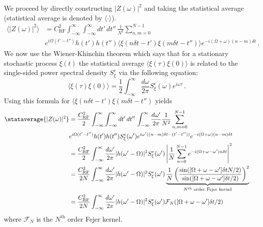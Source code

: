 We proceed by directly constructing $|Z(\omega)|^2$ and taking the statistical average (statistical average is denoted by $\langle \cdot \rangle$).
\begin{align}
  \langle \left| Z(\omega) \right| ^2 \rangle
  &= C_\text{RF}^2 \int_{-\infty}^\infty \int_{-\infty}^\infty dt' \, dt'' \,
  \frac{1}{N^2} \sum_{n,m=0}^{N-1} \nonumber \\
  & e^{i\Omega (t' - t'')} h(t') h(t'')
  \langle \xi(n\delta t - t') \xi(m\delta t - t'') \rangle
  e^{-i(\Omega + \omega)(n - m)\delta t} \, .
\end{align}
We now use the Wiener-Khinchin theorem which says that for a stationary stochastic process $\xi(t)$ the statistical average $\langle \xi(\tau) \xi(0) \rangle$  is related to the single-sided power spectral density $S^e_\xi$ via the following equation:
\begin{equation}
  \langle \xi(\tau) \xi(0) \rangle = \frac{1}{2}\int_{-\infty}^\infty \frac{d\omega}{2\pi} S^e_\xi(\omega) e^{i \omega \tau} \, .
\end{equation}
Using this formula for $\langle \xi(n\delta t - t') \xi(m\delta t - t'')$ yields
\begin{align}
\stataverage{|Z(\omega)|^2}
  &= \frac{C_\text{RF}^2}{2}
    \int_{-\infty}^\infty \int_{-\infty}^\infty dt' \, dt'' \, \int_{-\infty}^\infty \frac{d\omega'}{2\pi}\frac{1}{N^2} \sum_{n,m=0}^{N-1} \nonumber \\
  & e^{i\Omega (t' - t'')} h(t') h(t'') S^e_\xi(\omega') e^{i\omega' ((n-m)\delta t - (t' - t''))} e^{-i(\Omega + \omega)(n - m)\delta t} \\
  &= \frac{C_\text{RF}^2}{2} \int_{-\infty}^\infty \frac{d\omega'}{2\pi} |h(\omega' - \Omega)|^2 S^e_\xi(\omega') \left| \frac{1}{N} \sum_{n=0}^{N-1} e^{-i(\Omega + \omega - \omega') n \delta t} \right|^2 \\
  &= \frac{C_\text{RF}^2}{2N} \int_{-\infty}^\infty \frac{d\omega'}{2\pi} |h(\omega' - \Omega)|^2 S^e_\xi(\omega') \underbrace{
    \frac{1}{N} \left( \frac{\sin([\Omega + \omega - \omega'] \delta t N / 2)}{\sin([\Omega + \omega - \omega']\delta t / 2)} \right)^2
  }_{N^{\text{th}}\text{ order Fejer kernel}} \\
  &= \frac{C_\text{RF}^2}{2N} \int_{-\infty}^\infty \frac{d\omega'}{2\pi} |h(\omega' - \Omega)|^2 S^e_\xi(\omega') \mathcal{F}_N([\Omega + \omega - \omega'] \delta t / 2) \\
\end{align}
where $\mathcal{F}_N$ is the $N^{\text{th}}$ order Fejer kernel.
